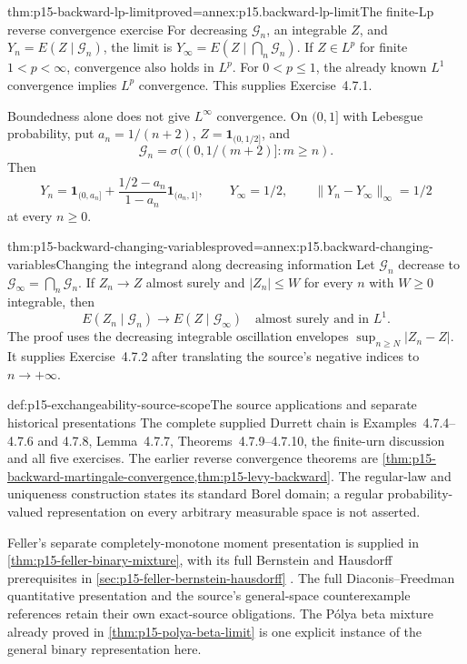 \begin{hbtheorem}{thm:p15-backward-lp-limit}{proved=annex:p15.backward-lp-limit}{The finite-Lp reverse convergence exercise}
For decreasing \(\mathcal G_n\), an integrable \(Z\), and
\(Y_n=E(Z\mid\mathcal G_n)\), the limit is
\(Y_\infty=E(Z\mid\bigcap_n\mathcal G_n)\).
If \(Z\in L^p\) for finite \(1<p<\infty\), convergence also holds
in \(L^p\). For \(0<p\leq1\), the already known \(L^1\) convergence
implies \(L^p\) convergence. This supplies Exercise~4.7.1.

Boundedness alone does not give \(L^\infty\) convergence.
On \((0,1]\) with Lebesgue probability, put
\(a_n=1/(n+2)\), \(Z=\mathbf1_{(0,1/2]}\), and
\[
 \mathcal G_n=\sigma((0,1/(m+2)]:m\geq n).
\]
Then
\[
 Y_n=\mathbf1_{(0,a_n]}
       +\frac{1/2-a_n}{1-a_n}\mathbf1_{(a_n,1]},
 \qquad Y_\infty=1/2,
 \qquad \|Y_n-Y_\infty\|_\infty=1/2
\]
at every \(n\geq0\).
\end{hbtheorem}

\begin{hbtheorem}{thm:p15-backward-changing-variables}{proved=annex:p15.backward-changing-variables}{Changing the integrand along decreasing information}
Let \(\mathcal G_n\) decrease to \(\mathcal G_\infty=\bigcap_n\mathcal G_n\).
If \(Z_n\to Z\) almost surely and \(|Z_n|\leq W\) for every \(n\)
with \(W\geq0\) integrable, then
\[
                   E(Z_n\mid\mathcal G_n)
                      \longrightarrow E(Z\mid\mathcal G_\infty)
                         \quad\text{almost surely and in }L^1.
\]
The proof uses the decreasing integrable oscillation envelopes
\(\sup_{n\geq N}|Z_n-Z|\).
It supplies Exercise~4.7.2 after translating the source's
negative indices to \(n\to+\infty\).
\end{hbtheorem}

\begin{proofboundary}{def:p15-exchangeability-source-scope}{The source applications and separate historical presentations}
The complete supplied Durrett chain is Examples~4.7.4--4.7.6 and 4.7.8,
Lemma~4.7.7, Theorems~4.7.9--4.7.10, the finite-urn discussion
and all five exercises. The earlier reverse convergence theorems
are \cref{thm:p15-backward-martingale-convergence,thm:p15-levy-backward}.
The regular-law and uniqueness construction states its standard
Borel domain; a regular probability-valued representation on every
arbitrary measurable space is not asserted.

Feller's separate completely-monotone moment presentation is supplied in
\cref{thm:p15-feller-binary-mixture}, with its full Bernstein and
Hausdorff prerequisites in \cref{sec:p15-feller-bernstein-hausdorff}
\cite[vol.~II, VII.1--VII.4]{Feller1971ProbabilityII}.
The full Diaconis--Freedman quantitative presentation and the source's
general-space counterexample references retain their own exact-source
obligations. The P\'olya beta mixture already proved in
\cref{thm:p15-polya-beta-limit} is one explicit instance of the
general binary representation here.
\end{proofboundary}
